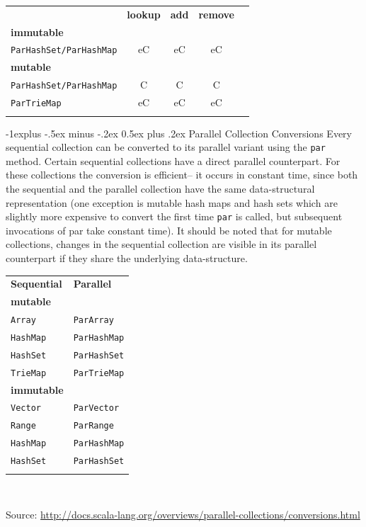 \documentclass[a4paper,twoside,10pt,landscape]{article}
\makeatletter
\renewcommand{\subsection}{\@startsection{subsection}{2}{0mm}%
                                {-1explus -.5ex minus -.2ex}%
                                {0.5ex plus .2ex}%
                                {\normalfont\normalsize\bfseries}}
\makeatother
\begin{document}
\begin{multicols}{3}
\begin{center}
\begin{tabular}{@{}lcccc@{}}
\hline\noalign{\smallskip}
 & \textbf{lookup} & \textbf{add} & \textbf{remove} \\
\noalign{\smallskip}\hline\noalign{\smallskip}
\textbf{immutable} &&& \\
\texttt{ParHashSet/ParHashMap} & eC & eC & eC \\
\textbf{mutable} &&& \\
\texttt{ParHashSet/ParHashMap} & C & C & C \\
\texttt{ParTrieMap} & eC & eC & eC \\
\noalign{\smallskip}\hline
\end{tabular}
\end{center}


\subsection{Parallel Collection Conversions}
Every sequential collection can be converted to its parallel variant using the \texttt{par} method. Certain sequential collections have a direct parallel counterpart. For these collections the conversion is efficient– it occurs in constant time, since both the sequential and the parallel collection have the same data-structural representation (one exception is mutable hash maps and hash sets which are slightly more expensive to convert the first time \texttt{par} is called, but subsequent invocations of par take constant time). It should be noted that for mutable collections, changes in the sequential collection are visible in its parallel counterpart if they share the underlying data-structure.

\begin{center}
\begin{tabular}{@{}ll@{}}
\hline\noalign{\smallskip}
\textbf{Sequential} & \textbf{Parallel} \\
\noalign{\smallskip}\hline\noalign{\smallskip}
\textbf{mutable} & \\
\texttt{Array} & \texttt{ParArray} \\
\texttt{HashMap} & \texttt{ParHashMap} \\
\texttt{HashSet} & \texttt{ParHashSet} \\
\texttt{TrieMap} & \texttt{ParTrieMap} \\
\textbf{immutable} & \\
\texttt{Vector} & \texttt{ParVector} \\
\texttt{Range} & \texttt{ParRange} \\
\texttt{HashMap} & \texttt{ParHashMap} \\
\texttt{HashSet} & \texttt{ParHashSet} \\
\noalign{\smallskip}\hline
\end{tabular} \\
\raggedright{\tiny{Source: \url{http://docs.scala-lang.org/overviews/parallel-collections/conversions.html}}}
\end{center}


\end{multicols}
\end{document}
